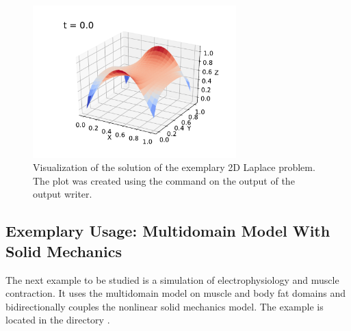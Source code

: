 \begin{figure}[H]
  \centering%
  \includegraphics[width=0.7\textwidth]{images/implementation/laplace_plot.pdf}%
  \caption{Visualization of the solution of the exemplary 2D Laplace problem. The plot was created using the  command on the output of the  output writer.}%
  \label{fig:laplace_example_plot}%
\end{figure}

\subsection{Exemplary Usage: Multidomain Model With Solid Mechanics}\label{sec:exemplary_usage_2}

The next example to be studied is a simulation of electrophysiology and muscle contraction. It uses the multidomain model on muscle and body fat domains and bidirectionally couples the nonlinear solid mechanics model. The example is located in the directory .

